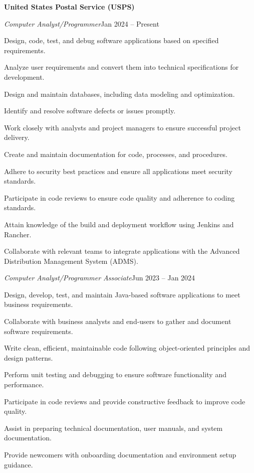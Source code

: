 \documentclass[a4paper, 12pt]{article}
\newcommand{\workplace}[1]{%
  \noindent\textbf{#1}\par
}
\newcommand{\workrole}[2]{%
  \noindent\hspace*{1em}\textit{#1}\hfill #2\par
}
\begin{document}
\begin{flushleft}
\noindent\begin{minipage}{\linewidth}
\workplace{United States Postal Service (USPS)}
\workrole{Computer Analyst/Programmer}{Jan 2024 -- Present}
\begin{compactitem}
    \item Design, code, test, and debug software applications based on specified requirements.
    \item Analyze user requirements and convert them into technical specifications for development.
    \item Design and maintain databases, including data modeling and optimization.
    \item Identify and resolve software defects or issues promptly.
    \item Work closely with analysts and project managers to ensure successful project delivery.
    \item Create and maintain documentation for code, processes, and procedures.
    \item Adhere to security best practices and ensure all applications meet security standards.
    \item Participate in code reviews to ensure code quality and adherence to coding standards.
    \item Attain knowledge of the build and deployment workflow using Jenkins and Rancher.
    \item Collaborate with relevant teams to integrate applications with the Advanced Distribution Management System (ADMS).
\end{compactitem}
\end{minipage}

\vspace{4pt}

\noindent\begin{minipage}{\linewidth}
\workrole{Computer Analyst/Programmer Associate}{Jun 2023 -- Jan 2024}
\begin{compactitem}
    \item Design, develop, test, and maintain Java-based software applications to meet business requirements.
    \item Collaborate with business analysts and end-users to gather and document software requirements.
    \item Write clean, efficient, maintainable code following object-oriented principles and design patterns.
    \item Perform unit testing and debugging to ensure software functionality and performance.
    \item Participate in code reviews and provide constructive feedback to improve code quality.
    \item Assist in preparing technical documentation, user manuals, and system documentation.
    \item Provide newcomers with onboarding documentation and environment setup guidance.
\end{compactitem}
\end{minipage}


\end{flushleft}
\end{document}
